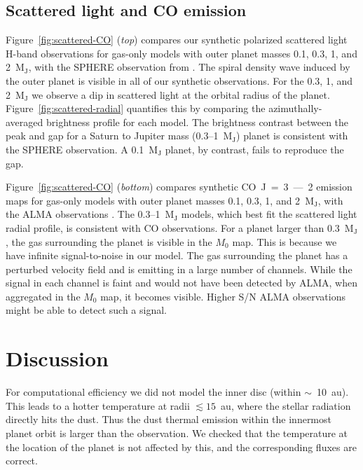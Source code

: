 \documentclass[usenatbib,a4paper,times]{mnras}
\begin{document}
\subsection{Scattered light and CO emission}

Figure~\ref{fig:scattered-CO} (\textit{top}) compares our synthetic polarized
scattered light H-band observations for gas-only models with outer planet masses
0.1, 0.3, 1, and 2~$\mathrm{M_J}$, with the SPHERE observation from
\citet{van-boekel:2017}. The spiral density wave induced by the outer planet is
visible in all of our synthetic observations. For the 0.3, 1, and
2~$\mathrm{M_J}$ we observe a dip in scattered light at the orbital radius of
the planet.  Figure~\ref{fig:scattered-radial} quantifies this by comparing the
azimuthally-averaged brightness profile for each model. The brightness contrast
between the peak and gap for a Saturn to Jupiter mass (0.3--1~$\mathrm{M_J}$)
planet is consistent with the SPHERE observation. A 0.1~$\mathrm{M_J}$ planet,
by contrast, fails to reproduce the gap.

Figure~\ref{fig:scattered-CO} (\textit{bottom}) compares synthetic
CO~J~=~3~---~2 emission maps for gas-only models with outer planet masses 0.1,
0.3, 1, and 2~$\mathrm{M_J}$, with the ALMA observations \citep{huang:2018}. The
0.3--1~$\mathrm{M_J}$ models, which best fit the scattered light radial profile,
is consistent with CO observations. For a planet larger than 0.3~$\mathrm{M_J}$,
the gas surrounding the planet is visible in the $M_0$ map.  This is because we
have infinite signal-to-noise in our model. The gas surrounding the planet has a
perturbed velocity field and is emitting in a large number of channels. While
the signal in each channel is faint and would not have been detected by ALMA,
when aggregated in the $M_0$ map, it becomes visible.  Higher S/N ALMA
observations might be able to detect such a signal.










\section{Discussion}
\label{sec:discussion}

For computational efficiency we did not model the inner disc (within
$\sim$~10~au). This leads to a hotter temperature at radii $\lesssim 15$~au,
where the stellar radiation directly hits the dust. Thus the dust thermal
emission within the innermost planet orbit is larger than the observation. We
checked that the temperature at the location of the planet is not affected by
this, and the corresponding fluxes are correct.
\end{document}
